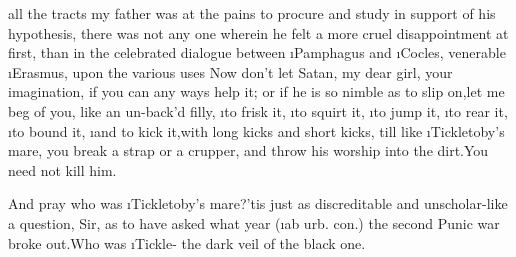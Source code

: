 \documentclass[twoside]{article}
\begin{document}
 all the tracts my father was at
the pains to procure and study in support of his hypothesis, there
was not any one wherein he felt a more cruel disappointment at
first, than in the celebrated dialogue between \i{Pamphagus} and
\i{Cocles}, 
venerable \i{Erasmus}, upon the various uses
\tsh Now don’t let Satan, my dear girl, 
your imagination, if you can any ways help it; or if he is so
nimble as to slip on,\tsh let me beg of you, like an un-\break back’d
filly, \i{to frisk it}, 
\i{to squirt it}, 
\i{to jump it}, 
\i{to rear it}, 
\i{to bound it},\tsh 
\i{and to kick it,\break with long kicks and short
kicks}, till like \i{Tickletoby}’s mare, you break a
strap\break
or a crupper, and throw his worship\break
into the dirt.\tsh You need not kill\break
him.\tsh

\tsk And pray who was \i{Tickletoby}’s
mare?\tsk ’tis just as discreditable and un\-scholar-like a
question, Sir, as to have asked what year (\i{ab urb.\@
con.})\@
the second Punic war broke out.\tsk Who was
\i{Tickle-}
the dark veil of the black one.
\end{document}
